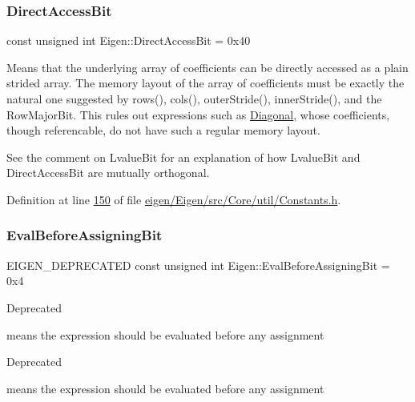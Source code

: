 \subsubsection{\texorpdfstring{Direct\+Access\+Bit}{DirectAccessBit}}
{\footnotesize\ttfamily const unsigned int Eigen\+::\+Direct\+Access\+Bit = 0x40}

Means that the underlying array of coefficients can be directly accessed as a plain strided array. The memory layout of the array of coefficients must be exactly the natural one suggested by rows(), cols(), outer\+Stride(), inner\+Stride(), and the Row\+Major\+Bit. This rules out expressions such as \hyperlink{group___core___module_class_eigen_1_1_diagonal}{Diagonal}, whose coefficients, though referencable, do not have such a regular memory layout.

See the comment on Lvalue\+Bit for an explanation of how Lvalue\+Bit and Direct\+Access\+Bit are mutually orthogonal. 

Definition at line \hyperlink{eigen_2_eigen_2src_2_core_2util_2_constants_8h_source_l00150}{150} of file \hyperlink{eigen_2_eigen_2src_2_core_2util_2_constants_8h_source}{eigen/\+Eigen/src/\+Core/util/\+Constants.\+h}.

\mbox{\label{group__flags_ga0972b20dc004d13984e642b3bd12532e}} 
\subsubsection{\texorpdfstring{Eval\+Before\+Assigning\+Bit}{EvalBeforeAssigningBit}}
{\footnotesize\ttfamily E\+I\+G\+E\+N\+\_\+\+D\+E\+P\+R\+E\+C\+A\+T\+ED const unsigned int Eigen\+::\+Eval\+Before\+Assigning\+Bit = 0x4}

\begin{DoxyRefDesc}{Deprecated}
\item[\hyperlink{deprecated__deprecated000012}{Deprecated}]means the expression should be evaluated before any assignment \end{DoxyRefDesc}


\begin{DoxyRefDesc}{Deprecated}
\item[\hyperlink{deprecated__deprecated000056}{Deprecated}]means the expression should be evaluated before any assignment \end{DoxyRefDesc}


